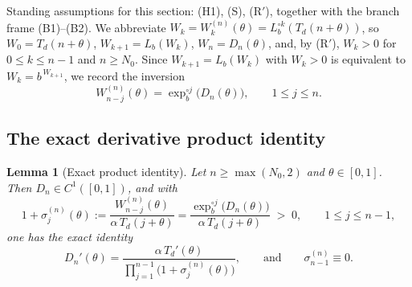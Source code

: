 \documentclass[11pt]{article}
\newtheorem{lemma}[theorem]{Lemma}
\theoremstyle{definition}
\theoremstyle{remark}
\newcommand{\Lb}{L_{b}}
\newcommand{\Td}{T_{d}}
\newcommand{\expb}{\exp_{b}}
\begin{document}
Standing assumptions for this section: (H1), (S), (R$'$), together
with the branch frame (B1)--(B2). We abbreviate
$W_k=W_k^{(n)}(\theta)=\Lb^{\circ k}(\Td(n+\theta))$, so
$W_0=\Td(n+\theta)$, $W_{k+1}=\Lb(W_k)$, $W_n=D_n(\theta)$, and, by
(R$'$), $W_k>0$ for $0\le k\le n-1$ and $n\ge N_0$. Since
$W_{k+1}=\Lb(W_k)$ with $W_k>0$ is equivalent to $W_k=b^{\,W_{k+1}}$, we
record the inversion
\begin{equation}\label{eq:inversion}
W_{n-j}^{(n)}(\theta)=\expb^{\circ j}\big(D_n(\theta)\big),
\qquad 1\le j\le n .
\end{equation}

\subsection{The exact derivative product identity}

\begin{lemma}[Exact product identity]\label{lem:product}
Let $n\ge\max(N_0,2)$ and $\theta\in[0,1]$. Then $D_n\in C^{1}([0,1])$,
and with
\begin{equation}\label{eq:sigmadef}
1+\sigma_j^{(n)}(\theta)
:=\frac{W_{n-j}^{(n)}(\theta)}{\alpha\,\Td(j+\theta)}
=\frac{\expb^{\circ j}\big(D_n(\theta)\big)}{\alpha\,\Td(j+\theta)}\;>\;0,
\qquad 1\le j\le n-1,
\end{equation}
one has the \emph{exact} identity
\begin{equation}\label{eq:exact}
D_n'(\theta)
=\frac{\alpha\,\Td'(\theta)}{\displaystyle\prod_{j=1}^{n-1}\big(1+\sigma_j^{(n)}(\theta)\big)} ,
\qquad\text{and}\qquad
\sigma_{n-1}^{(n)}\equiv 0 .
\end{equation}
\end{lemma}
\end{document}
